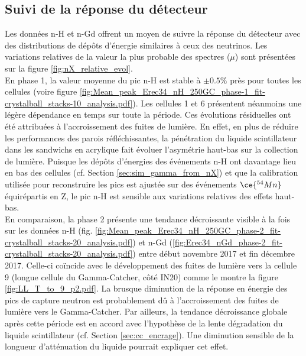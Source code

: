 \subsection{Suivi de la réponse du détecteur}

Les données n-H et n-Gd offrent un moyen de suivre la réponse du détecteur avec des distributions de dépôts d'énergie similaires à ceux des neutrinos. Les variations relatives de la valeur la plus probable des spectres ($\mu$) sont présentées sur la figure \ref{fig:nX_relative_evol}.\\

En phase 1, la valeur moyenne du pic n-H est stable à $\pm 0.5\%$ près pour toutes les cellules (voire figure \ref{fig:Mean_peak_Erec34_nH_250GC_phase-1_fit-crystalball_stacks-10_analysis.pdf}). Les cellules 1 et 6 présentent néanmoins une légère dépendance en temps sur toute la période. Ces évolutions résiduelles ont été attribuées à l'accroissement des fuites de lumière. En effet, en plus de réduire les performances des parois réfléchissantes, la pénétration du liquide scintillateur dans les sandwichs en acrylique fait évoluer l'asymétrie haut-bas sur la collection de lumière. Puisque les dépôts d'énergies des événements n-H ont davantage lieu en bas des cellules (cf. Section \ref{sec:sim_gamma_from_nX}) et que la calibration utilisée pour reconstruire les pics est ajustée sur des événements $\ce{^{54}Mn}$ équirépartis en Z, le pic n-H est sensible aux variations relatives des effets haut-bas.\\

En comparaison, la phase 2 présente une tendance décroissante visible à la fois sur les données n-H (fig. \ref{fig:Mean_peak_Erec34_nH_250GC_phase-2_fit-crystalball_stacks-20_analysis.pdf}) et n-Gd (\ref{fig:Erec34_nGd_phase-2_fit-crystalball_stacks-20_analysis.pdf}) entre début novembre 2017 et fin décembre 2017. Celle-ci coïncide avec le développement des fuites de lumière vers la cellule 9 (longue cellule du Gamma-Catcher, côté IN20) comme le montre la figure \ref{fig:LL_T_to_9_p2.pdf}. La brusque diminution de la réponse en énergie des pics de capture neutron est probablement dû à l'accroissement des fuites de lumière vers le Gamma-Catcher. Par ailleurs, la tendance décroissance globale après cette période est en accord avec l'hypothèse de la lente dégradation du liquide scintillateur (cf. Section \ref{sec:cc_encrage}). Une diminution sensible de la longueur d'atténuation du liquide pourrait expliquer cet effet.\\

